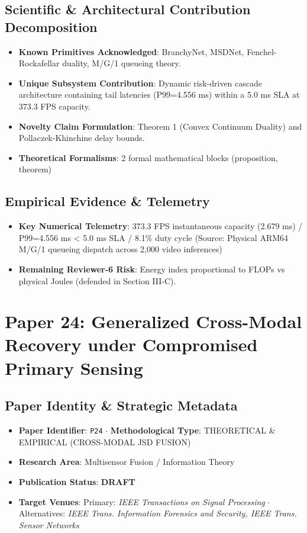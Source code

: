 \documentclass[11pt,a4paper]{article}
\begin{document}
\subsection*{Scientific & Architectural Contribution Decomposition}
\begin{itemize}[leftmargin=1.5em, itemsep=0.2em]
    \item \textbf{Known Primitives Acknowledged}: BranchyNet, MSDNet, Fenchel-Rockafellar duality, M/G/1 queueing theory.
    \item \textbf{Unique Subsystem Contribution}: Dynamic risk-driven cascade architecture containing tail latencies (P99=4.556 ms) within a 5.0 ms SLA at 373.3 FPS capacity.
    \item \textbf{Novelty Claim Formulation}: Theorem 1 (Convex Continuum Duality) and Pollaczek-Khinchine delay bounds.
    \item \textbf{Theoretical Formalisms}: 2 formal mathematical blocks (proposition, theorem)
\end{itemize}

\subsection*{Empirical Evidence & Telemetry}
\begin{itemize}[leftmargin=1.5em, itemsep=0.2em]
    \item \textbf{Key Numerical Telemetry}: 373.3 FPS instantaneous capacity (2.679 ms) / P99=4.556 ms < 5.0 ms SLA / 8.1\% duty cycle (Source: Physical ARM64 M/G/1 queueing dispatch across 2,000 video inferences)
    \item \textbf{Remaining Reviewer-6 Risk}: Energy index proportional to FLOPs vs physical Joules (defended in Section III-C).
\end{itemize}

\section{Paper 24: Generalized Cross-Modal Recovery under Compromised Primary Sensing}

\subsection*{Paper Identity \& Strategic Metadata}
\begin{itemize}[leftmargin=1.5em, itemsep=0.2em]
    \item \textbf{Paper Identifier}: \texttt{P24} $\cdot$ \textbf{Methodological Type}: THEORETICAL \& EMPIRICAL (CROSS-MODAL JSD FUSION)
    \item \textbf{Research Area}: Multisensor Fusion / Information Theory
    \item \textbf{Publication Status}: \textbf{DRAFT}
    \item \textbf{Target Venues}: Primary: \textit{IEEE Transactions on Signal Processing} $\cdot$ Alternatives: \textit{IEEE Trans. Information Forensics and Security, IEEE Trans. Sensor Networks}
\end{itemize}
\end{document}
